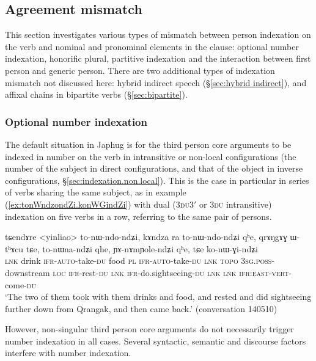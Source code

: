 \subsection{Agreement mismatch}  \label{sec:agreement.mismatch}
This section investigates various types of mismatch between person indexation on the verb and nominal and pronominal elements in the clause: optional number indexation, honorific plural, partitive indexation and the interaction between first person and generic person. There are two additional types of indexation mismatch not discussed here: hybrid indirect speech (§\ref{sec:hybrid indirect}), and affixal chains in bipartite verbs (§\ref{sec:bipartite}).
 
\subsubsection{Optional number indexation} \label{sec:optional.indexation}
The default situation in Japhug is for the third person core arguments to be indexed in number on the verb in intransitive or non-local configurations (the number of the subject in direct configurations, and that of the object in inverse configurations, §\ref{sec:indexation.non.local}). This is the case in particular in series of verbs sharing the same subject, as in example (\ref{ex:tonWndzondZi.konWGindZi}) with dual (\textsc{3du}\fl{}3$'$ or \textsc{3du} intransitive) indexation on five verbs in a row, referring to the same pair of persons.

\begin{exe}
\ex \label{ex:tonWndzondZi.konWGindZi}
\gll tɕendɤre <yinliao> to-nɯ-ndo-ndʑi, kɤndza ra to-nɯ-ndo-ndʑi qʰe,
qrɤŋgɤɣ ɯ-tʰɤcu tɕe,  to-nɯna-ndʑi qhe, ɲɤ-nɤmɲole-ndʑi qʰe, tɕe ko-nɯ-ɣi-ndʑi \\
\textsc{lnk} drink \textsc{ifr}-\textsc{auto}-take-\textsc{du} food \textsc{pl} \textsc{ifr}-\textsc{auto}-take-\textsc{du} \textsc{lnk}  \textsc{topo} \textsc{3sg}.\textsc{poss}-downstream \textsc{loc} \textsc{ifr}-rest-\textsc{du} \textsc{lnk} \textsc{ifr}-do.sightseeing-\textsc{du} \textsc{lnk} \textsc{lnk}  \textsc{ifr}:\textsc{east}-\textsc{vert}-come-\textsc{du} \\
\glt `The two of them took with them drinks and food, and rested and did sightseeing further down from Qrangak, and then came back.' (conversation 140510)
\end{exe}

However, non-singular third person core arguments do not necessarily trigger number indexation in all cases. Several syntactic, semantic and discourse factors interfere with number indexation.

